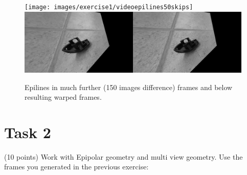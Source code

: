 \documentclass[UTF-8]{article}
\begin{document}
\begin{enumerate}[a.]
	\begin{figure}[H]
		\centering
		\texttt{[image: images/exercise1/videoepilines50skips]}
		\includegraphics[width=0.7\linewidth]{images/exercise1/videowarped50skips}
		\caption{Epilines in much further (150 images difference) frames and below resulting warped frames.}
		\label{fig:videowarped50skips}
	\end{figure}
	\end{enumerate}
	
	\section*{Task 2}
	(10 points) Work with Epipolar geometry and multi view geometry. Use the 
	frames you generated in the previous exercise:
\end{document}
